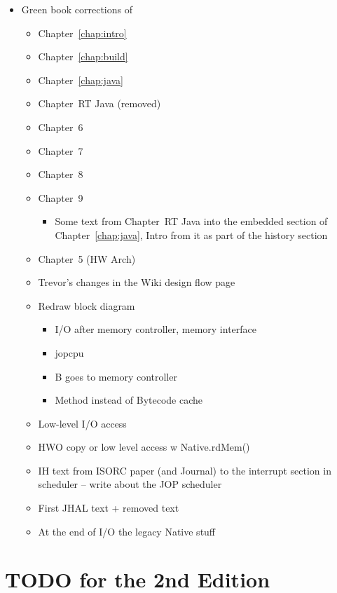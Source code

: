 \begin{itemize}
  \item Green book corrections of
  \begin{itemize}
    \item Chapter~\ref{chap:intro}
    \item Chapter~\ref{chap:build}
    \item Chapter~\ref{chap:java}
    \item Chapter~RT Java (removed)
    \item Chapter~6
    \item Chapter~7
    \item Chapter~8
    \item Chapter~9
    \begin{itemize}
      \item Some text from Chapter~RT Java into the
          embedded section of Chapter~\ref{chap:java},
          Intro from it as part of the history section
    \end{itemize}
    \item Chapter~5 (HW Arch)
    \item Trevor's changes in the Wiki design flow page
    \item Redraw block diagram
    \begin{itemize}
      \item I/O after memory controller, memory interface
      \item jopcpu
      \item B goes to memory controller
      \item Method instead of Bytecode cache
    \end{itemize}
    \item Low-level I/O access
    \item HWO copy or low level access w Native.rdMem()
    \item IH text from ISORC paper (and Journal) to the
        interrupt section in scheduler -- write about the JOP
        scheduler
    \item First JHAL text + removed text
    \item At the end of I/O the legacy Native stuff


  \end{itemize}
\end{itemize}

\chapter{TODO for the 2nd Edition}

